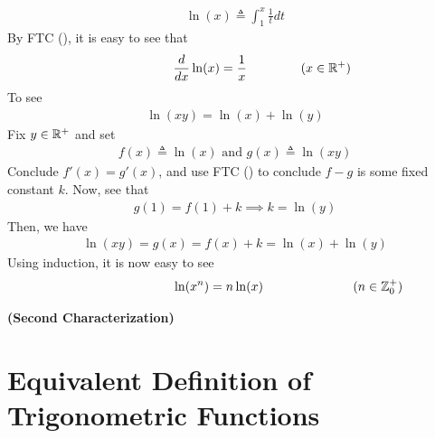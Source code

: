 \documentclass{report}
\begin{document}
\begin{mdframed}
\begin{align*}
\ln (x)\triangleq \int_1^x \frac{1}{t}dt
\end{align*}
By FTC (), it is easy to see that 
 \begin{align*}
\hspace{1.5cm}\frac{d}{dx}\ln (x)=\frac{1}{x}\hspace{1.5cm}(x\in\mathbb{R}^+)
\end{align*}
To see 
\begin{align*}
\ln (xy)=\ln (x)+ \ln (y)
\end{align*}
Fix $y\in\mathbb{R}^+$ and set 
\begin{align*}
f(x)\triangleq \ln (x)\text{ and }g(x)\triangleq \ln(xy)
\end{align*}
Conclude $f'(x)=g'(x)$, and use FTC () to conclude $f-g$ is some fixed constant $k$. Now, see that 
\begin{align*}
g(1)=f(1)+k \implies k=\ln(y)
\end{align*}
Then, we have 
\begin{align*}
\ln(xy)=g(x)=f(x)+k=\ln (x)+ \ln (y)
\end{align*}
Using induction, it is now easy to see 
\begin{align*}
  \hspace{3cm}\ln (x^n)=n \ln (x)\hspace{2.5cm}(n\inz_0^+)
\end{align*}
\end{mdframed}
\begin{theorem}
\textbf{(Second Characterization)}
\end{theorem}
\section{Equivalent Definition of Trigonometric Functions}
\end{document}
